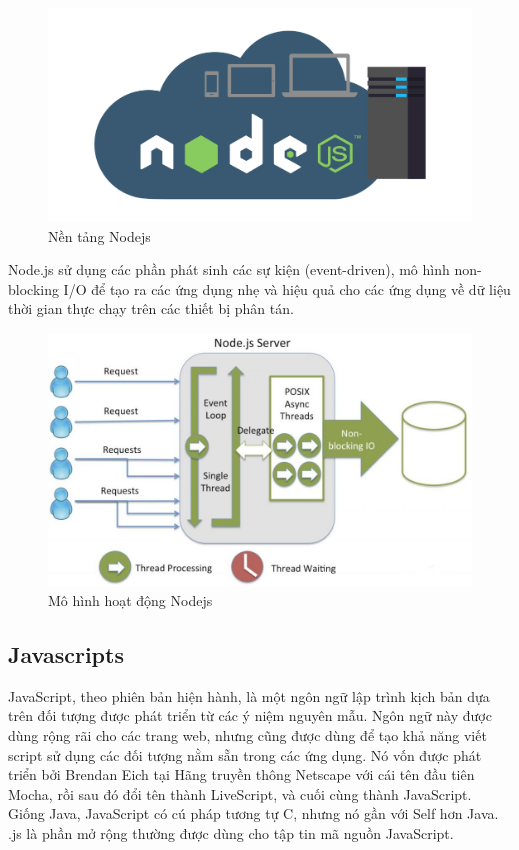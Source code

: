 \begin{figure}[H]
	\centering    
	\includegraphics[width=1.0\textwidth]{nodejs0}
	\caption[Nền tảng Nodejs]{Nền tảng Nodejs}
	\label{fig: nodejs0}
\end{figure}

Node.js sử dụng các phần phát sinh các sự kiện (event-driven), mô hình non-blocking I/O để tạo ra các ứng dụng nhẹ và hiệu quả cho các ứng dụng về dữ liệu thời gian thực chạy trên các thiết bị phân tán.

\begin{figure}[H]
	\centering    
	\includegraphics[width=1.0\textwidth]{nodejs1}
	\caption[Mô hình hoạt động Nodejs]{Mô hình hoạt động Nodejs}
	\label{fig: nodejs1}
\end{figure}

\subsection{Javascripts}
JavaScript, theo phiên bản hiện hành, là một ngôn ngữ lập trình kịch bản dựa trên đối tượng được phát triển từ các ý niệm nguyên mẫu. Ngôn ngữ này được dùng rộng rãi cho các trang web, nhưng cũng được dùng để tạo khả năng viết script sử dụng các đối tượng nằm sẵn trong các ứng dụng. Nó vốn được phát triển bởi Brendan Eich tại Hãng truyền thông Netscape với cái tên đầu tiên Mocha, rồi sau đó đổi tên thành LiveScript, và cuối cùng thành JavaScript. Giống Java, JavaScript có cú pháp tương tự C, nhưng nó gần với Self hơn Java. .js là phần mở rộng thường được dùng cho tập tin mã nguồn JavaScript.

